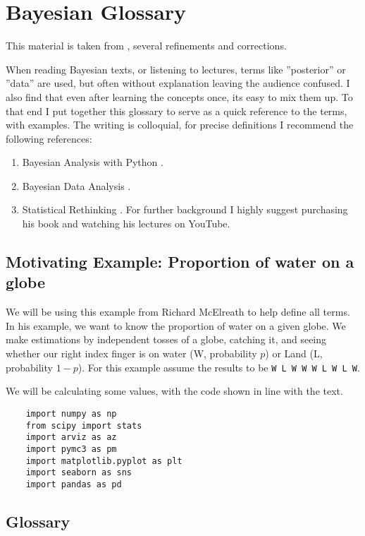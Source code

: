 
\chapter{Bayesian Glossary}
\label{chap:BayesianGlossary}


This material is taken from \cite{RavinKumarBayesianGlossary2019}, several refinements and corrections.

When reading Bayesian texts, or listening to lectures, terms like ''posterior'' or ''data'' are used, but often without explanation leaving the audience confused. I also find that even after learning the concepts once, its easy to mix them up. To that end I put together this glossary to serve as a quick reference to the terms, with examples. The writing is colloquial, for precise definitions I recommend the following references:
\begin{enumerate}
\item Bayesian Analysis with Python \cite{martin2018}. 
\item Bayesian Data Analysis \cite{gelmanbda04}.
\item Statistical Rethinking \cite{McElreath2015}. For further background I highly suggest purchasing his book and watching his lectures on YouTube.
\end{enumerate}

\section{Motivating Example: Proportion of water on a globe}

We will be using this example from Richard McElreath \cite{McElreath2015} to help define all terms. In his example, we want to know the proportion of water on a given globe. We make estimations by independent tosses of a globe, catching it, and seeing whether our right index finger is on water (W, probability $p$) or Land (L, probability $1-p$).  For this example assume the results to be \lstinline{W L W W W L W L W}.

We will be calculating some values, with the code shown in line with the text.
\begin{lstlisting}
    import numpy as np
    from scipy import stats
    import arviz as az
    import pymc3 as pm
    import matplotlib.pyplot as plt
    import seaborn as sns
    import pandas as pd
\end{lstlisting}

\section{Glossary}

